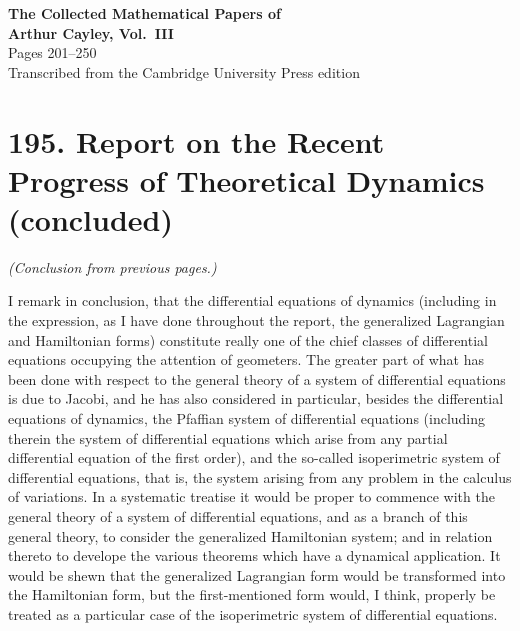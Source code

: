 \documentclass[12pt,a4paper]{article}
\theoremstyle{definition}
\begin{document}
\begin{center}
{\Large\bfseries The Collected Mathematical Papers of\\[0.5em] Arthur Cayley, Vol.~III}\\[2em]
{\large Pages 201--250}\\[1em]
{\normalsize Transcribed from the Cambridge University Press edition}
\end{center}

\vspace{2em}

\tableofcontents
\newpage


\section*{195. Report on the Recent Progress of Theoretical Dynamics (concluded)}

\noindent\textit{(Conclusion from previous pages.)}

\medskip

I remark in conclusion, that the differential equations of dynamics (including in
the expression, as I have done throughout the report, the generalized Lagrangian and
Hamiltonian forms) constitute really one of the chief classes of differential equations
occupying the attention of geometers. The greater part of what has been done with
respect to the general theory of a system of differential equations is due to Jacobi,
and he has also considered in particular, besides the differential equations of dynamics,
the Pfaffian system of differential equations (including therein the system of differential
equations which arise from any partial differential equation of the first order), and
the so-called isoperimetric system of differential equations, that is, the system arising
from any problem in the calculus of variations. In a systematic treatise it would be
proper to commence with the general theory of a system of differential equations, and
as a branch of this general theory, to consider the generalized Hamiltonian system;
and in relation thereto to develope the various theorems which have a dynamical
application. It would be shewn that the generalized Lagrangian form would be transformed
into the Hamiltonian form, but the first-mentioned form would, I think,
properly be treated as a particular case of the isoperimetric system of differential
equations.

\bigskip
\end{document}
